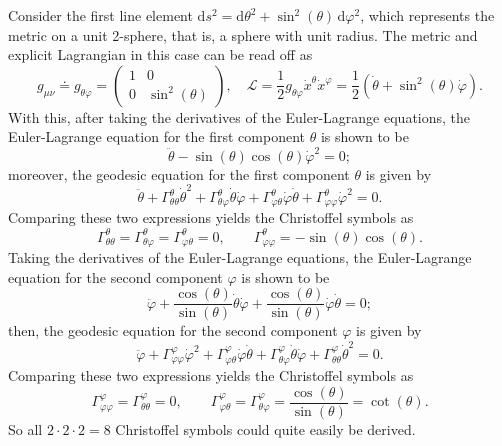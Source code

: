 \documentclass[a4paper,11pt]{article}
\numberwithin{equation}{section}
\begin{document}
{Consider the first line element $\mathrm{d}s^2 = \mathrm{d}\theta^2 + \sin^2(\theta)\,\mathrm{d}\varphi^2$, which represents the metric on a unit 2-sphere, that is, a sphere with unit radius. The metric and explicit Lagrangian in this case can be read off as \begin{equation}
g_{\mu\nu} \doteq g_{\theta\varphi} = \begin{pmatrix}
1 & 0 \\ 0 & \sin^2(\theta)
\end{pmatrix},  \quad \mathcal{L} = \frac{1}{2}g_{\theta\varphi}\dot{x}^\theta \dot{x}^\varphi = \frac{1}{2}\left(\dot{\theta} + \sin^2(\theta)\dot{\varphi}\right).
\end{equation} With this, after taking the derivatives of the Euler-Lagrange equations, the Euler-Lagrange equation for the first component $\theta$ is shown to be \begin{equation}
\ddot{\theta} - \sin(\theta)\cos(\theta)\dot{\varphi}^2 = 0;
\end{equation} moreover, the geodesic equation for the first component $\theta$ is given by \begin{equation}
\ddot{\theta} + \Gamma^{\theta}_{\theta\theta}\dot{\theta}^2 + \Gamma^{\theta}_{\theta\varphi}\dot{\theta}\dot{\varphi} + \Gamma^{\theta}_{\varphi\theta}\dot{\varphi}\dot{\theta} + \Gamma^\theta_{\varphi\varphi}\dot{\varphi}^2 = 0.
\end{equation} Comparing these two expressions yields the Christoffel symbols as \begin{equation}
\Gamma^{\theta}_{\theta\theta} = \Gamma^{\theta}_{\theta\varphi} = \Gamma^{\theta}_{\varphi\theta} = 0, \qquad \Gamma^\theta_{\varphi\varphi} = -\sin(\theta)\cos(\theta).
\end{equation}
Taking the derivatives of the Euler-Lagrange equations, the Euler-Lagrange equation for the second component $\varphi$ is shown to be \begin{equation}
\ddot{\varphi} + \frac{\cos(\theta)}{\sin(\theta)}\dot{\theta}\dot{\varphi} +  \frac{\cos(\theta)}{\sin(\theta)}\dot{\varphi}\dot{\theta} = 0;
\end{equation} then, the geodesic equation for the second component $\varphi$ is given by \begin{equation}
\ddot{\varphi} + \Gamma^{\varphi}_{\varphi\varphi}\dot{\varphi}^2 + \Gamma^{\varphi}_{\varphi\theta}\dot{\varphi}\dot{\theta} + \Gamma^{\varphi}_{\theta\varphi}\dot{\theta}\dot{\varphi} + \Gamma^\varphi_{\theta\theta}\dot{\theta}^2 = 0.
\end{equation} Comparing these two expressions yields the Christoffel symbols as \begin{equation}
\Gamma^{\varphi}_{\varphi\varphi} = \Gamma^{\varphi}_{\theta\theta} = 0, \qquad \Gamma^\varphi_{\varphi\theta} = \Gamma^\varphi_{\theta\varphi} = \frac{\cos(\theta)}{\sin(\theta)} = \cot(\theta).
\end{equation} So all $2\cdot2\cdot2 = 8$ Christoffel symbols could quite easily be derived.

}
\end{document}

